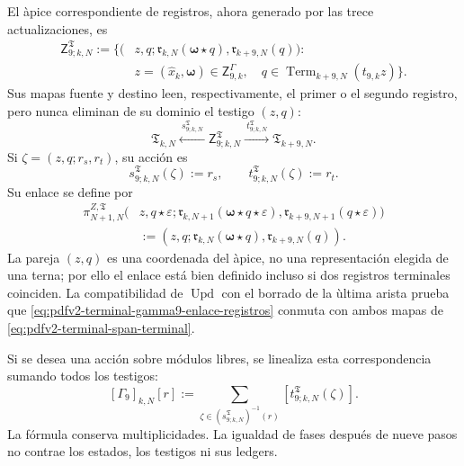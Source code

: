 El \`apice correspondiente de registros, ahora generado por las trece
actualizaciones, es
\begin{equation}
\label{eq:pdfv2-terminal-apice-terminal-gamma9}
 \begin{split}
 \mathsf Z^{\mathfrak T}_{9;k,N}:=\bigl\{
 (&z,q;
   \mathfrak r_{k,N}(\boldsymbol\omega\star q),
   \mathfrak r_{k+9,N}(q)):\\
 &z=(\widehat x_k,\boldsymbol\omega)\in
       \mathsf Z^\Gamma_{9,k},\quad
 q\in\operatorname{Term}_{k+9,N}(t_{9,k}z)
 \bigr\}.
 \end{split}
\end{equation}
Sus mapas fuente y destino leen, respectivamente, el primer o el segundo
registro, pero nunca eliminan de su dominio el testigo \((z,q)\):
\begin{equation}
\label{eq:pdfv2-terminal-span-terminal}
 \mathfrak T_{k,N}
 \xleftarrow{\ s^{\mathfrak T}_{9;k,N}\ }
 \mathsf Z^{\mathfrak T}_{9;k,N}
 \xrightarrow{\ t^{\mathfrak T}_{9;k,N}\ }
 \mathfrak T_{k+9,N}.
\end{equation}
Si \(\zeta=(z,q;r_s,r_t)\), su acción es
\begin{equation}
\label{eq:pdfv2-terminal-span-terminal-accion}
 s^{\mathfrak T}_{9;k,N}(\zeta):=r_s,
 \qquad
 t^{\mathfrak T}_{9;k,N}(\zeta):=r_t.
\end{equation}
Su enlace se define por
\begin{equation}
\label{eq:pdfv2-terminal-gamma9-enlace-registros}
 \begin{split}
 \pi^{Z,\mathfrak T}_{N+1,N}
 \bigl(&z,q\star\varepsilon;
       \mathfrak r_{k,N+1}
          (\boldsymbol\omega\star q\star\varepsilon),
       \mathfrak r_{k+9,N+1}(q\star\varepsilon)\bigr)\\
 &:=(z,q;\mathfrak r_{k,N}(\boldsymbol\omega\star q),
       \mathfrak r_{k+9,N}(q)).
 \end{split}
\end{equation}
La pareja \((z,q)\) es una coordenada del \`apice, no una representación
elegida de una terna; por ello el enlace está bien definido incluso si dos
registros terminales coinciden. La compatibilidad de
\(\operatorname{Upd}\) con el borrado de la \`ultima arista prueba que
\eqref{eq:pdfv2-terminal-gamma9-enlace-registros} conmuta con ambos mapas de
\eqref{eq:pdfv2-terminal-span-terminal}.

Si se desea una acci\'on sobre m\'odulos libres, se linealiza esta
correspondencia sumando todos los testigos:
\begin{equation}
\label{eq:pdfv2-terminal-linealizacion-span}
 [\Gamma_9]_{k,N}[r]
 :=\sum_{\zeta\in(s^{\mathfrak T}_{9;k,N})^{-1}(r)}
 [t^{\mathfrak T}_{9;k,N}(\zeta)].
\end{equation}
La f\'ormula conserva multiplicidades. La igualdad de fases despu\'es de
nueve pasos no contrae los estados, los testigos ni sus ledgers.

